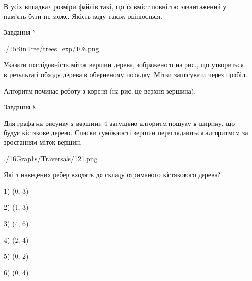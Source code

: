 \documentclass[12pt, ukrainian]{article}
\begin{document}
{В усіх випадках розміри файлів такі, що їх вміст повністю завантажений у пам'ять бути не може. Якість коду також оцінюється.



\vspace{10mm}\par

\newpage
\begin{minipage}[t]{9.7cm}
               
{\begin{center}Завдання {7}\end{center}}
\vspace{-6mm}

\begin{center}
	{./15BinTree/trees_exp/108.png}
\end{center}
Указати послідовність міток вершин дерева, зображеного на рис., що утвориться в результаті обходу дерева в оберненому порядку. Мітки записувати через пробіл.\par Алгоритм починає роботу з кореня (на рис. це верхня вершина).\par

\end{minipage}
\vline \hspace{8mm}
\begin{minipage}[t]{8.0cm}
               
{\begin{center}Завдання {8}\end{center}}
\vspace{-6mm}
Для графа на рисунку з вершини 4 запущено алгоритм пошуку в ширину, що будує кістякове дерево. Списки суміжності вершин переглядаються алгоритмом за зростанням міток вершин.\par
\begin{center}
	{./16Graphs/Traversals/121.png}
\end{center}
\par Які з наведених ребер входять до складу отриманого кістякового дерева?\par
1) (0, 3)\par
2) (1, 3)\par
3) (4, 6)\par
4) (2, 4)\par
5) (0, 2)\par
6) (0, 4)\par
{\vskip 15pt} \par


\end{minipage}}
\end{document}
